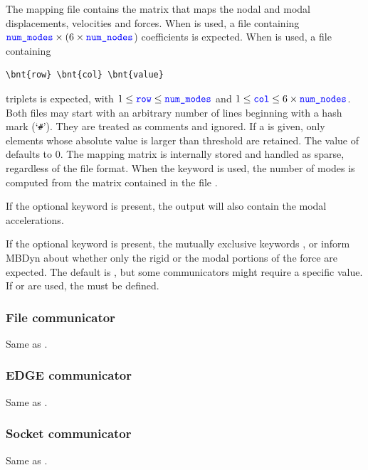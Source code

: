 The mapping file contains the matrix that maps the nodal and modal
displacements, velocities and forces.
When  is used, a file containing
$\textcolor{blue}{\texttt{num\_modes}} \times (6\times\textcolor{blue}{\texttt{num\_nodes}}$) coefficients is expected.
When  is used, a file containing
\begin{Verbatim}[commandchars=\\\{\}]
\bnt{row} \bnt{col} \bnt{value}
\end{Verbatim}
triplets is expected, with $1 \le \textcolor{blue}{\texttt{row}} \le \textcolor{blue}{\texttt{num\_modes}}$
and $1 \le \textcolor{blue}{\texttt{col}} \le 6\times\textcolor{blue}{\texttt{num\_nodes}}$.
Both files may start with an arbitrary number of lines beginning
with a hash mark (`\texttt{\#}').
They are treated as comments and ignored.
If a  is given, only elements whose absolute value
is larger than threshold are retained.
The value of  defaults to 0.
The mapping matrix is internally stored and handled as sparse,
regardless of the file format.
When the keyword  is used, the number of modes 
is computed from the matrix contained in the file .

If the optional keyword  is present,
the output will also contain the modal accelerations.

If the optional keyword  is present,
the mutually exclusive keywords ,  or 
inform MBDyn about whether only the rigid or the modal portions
of the force are expected.
The default is , but some communicators might require
a specific value.
If  or  are used, the  must be defined.



\subsubsection{File communicator}
Same as .

\subsubsection{EDGE communicator}
Same as .

\subsubsection{Socket communicator}
Same as .

